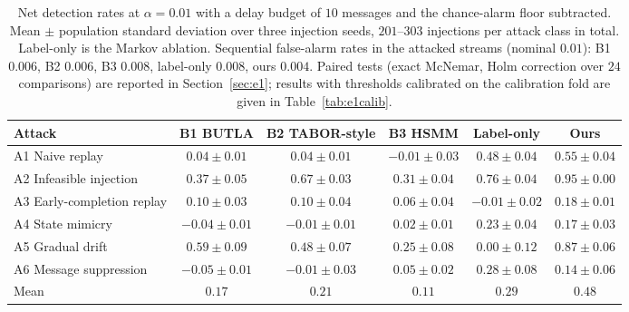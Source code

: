 \documentclass[manuscript,screen,review]{acmart}
\begin{document}
\begin{table}[!t]
\renewcommand{\arraystretch}{1.15}
\caption{Net detection rates at $\alpha=0.01$ with a delay budget of $10$ messages and the chance-alarm floor subtracted. Mean $\pm$ population standard deviation over three injection seeds, $201$--$303$ injections per attack class in total. Label-only is the Markov ablation. Sequential false-alarm rates in the attacked streams (nominal $0.01$): {B1} $0.006$, {B2} $0.006$, {B3} $0.008$, label-only $0.008$, ours $0.004$. Paired tests (exact {McNemar}, {Holm} correction over $24$ comparisons) are reported in Section~\ref{sec:e1}; results with thresholds calibrated on the calibration fold are given in Table~\ref{tab:e1calib}.}
\label{tab:e1}
\centering
\scriptsize
\begin{tabular}{lccccc}
\toprule
Attack & {B1} {BUTLA} & {B2} {TABOR}-style & {B3} {HSMM} & Label-only & Ours \\
\midrule
{A1} Naive replay & $0.04{\pm}0.01$ & $0.04{\pm}0.01$ & $-0.01{\pm}0.03$ & $0.48{\pm}0.04$ & $0.55{\pm}0.04$ \\
{A2} Infeasible injection & $0.37{\pm}0.05$ & $0.67{\pm}0.03$ & $0.31{\pm}0.04$ & $0.76{\pm}0.04$ & $0.95{\pm}0.00$ \\
{A3} Early-completion replay & $0.10{\pm}0.03$ & $0.10{\pm}0.04$ & $0.06{\pm}0.04$ & $-0.01{\pm}0.02$ & $0.18{\pm}0.01$ \\
{A4} State mimicry & $-0.04{\pm}0.01$ & $-0.01{\pm}0.01$ & $0.02{\pm}0.01$ & $0.23{\pm}0.04$ & $0.17{\pm}0.03$ \\
{A5} Gradual drift & $0.59{\pm}0.09$ & $0.48{\pm}0.07$ & $0.25{\pm}0.08$ & $0.00{\pm}0.12$ & $0.87{\pm}0.06$ \\
{A6} Message suppression & $-0.05{\pm}0.01$ & $-0.01{\pm}0.03$ & $0.05{\pm}0.02$ & $0.28{\pm}0.08$ & $0.14{\pm}0.06$ \\
\midrule
Mean & $0.17$ & $0.21$ & $0.11$ & $0.29$ & $0.48$ \\
\bottomrule
\end{tabular}
\end{table}
\end{document}
